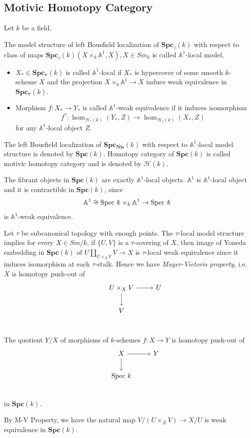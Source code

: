 \documentclass[b5paper,10pt]{article}
\begin{document}
\subsection{Motivic Homotopy Category}
Let $k$ be a field.
\begin{secdefn}
	The model structure of left Bousfield localization of $\mathbf{Spc}_\tau(k)$ with respect to class of maps $\mathbf{Spc}_\tau(k)(X \times_k \mathbb{A}^1, X), X \in Sm_k$ is called \emph{$\mathbb{A}^1$}-local model.
	\begin{itemize}
		\item $X_* \in \mathbf{Spc_\tau}(k) $ is called $\mathbb{A}^1$-local if $X_*$ is hypercover of some smooth $k$-scheme $X$ and the projection $X \times_k \mathbb{A}^1 \to X$ induce weak equivalence in $\mathbf{Spc_\tau}(k)$.
		\item Morphism $f: X_* \to Y_*$  is called $\mathbb{A}^1$-weak equivalence if it induces
		isomorphism
		\[
		f^* \colon \hom_{\mathcal{H}_\tau(k)}(Y_*, Z) \to \hom_{\mathcal{H}_\tau(k)}(X_*,Z)
		\]
		for any $\mathbb{A}^1$-local object $Z$.
	\end{itemize}
\end{secdefn}

\begin{secdefn}
	The left Bousfield localization of $\mathbf{Spc_{Nis}}(k)$ with respect to $\mathbb{A}^1$-local model structure is denoted by $\mathbf{Spc}(k)$. Homotopy category of $\mathbf{Spc}(k)$ is called motivic homotopy category and is denoted by $\mathcal{H}(k)$.
\end{secdefn}
The fibrant objects in $\mathbf{Spc}(k)$ are exactly $\mathbb{A}^1$-local objects. $\mathbb{A}^1$ is $\mathbb{A}^1$-local object and it is contractible in $\mathbf{Spc}(k)$, since
\[
\mathbb{A}^1 \cong \text{Spec } k \times_k \mathbb{A}^1 \to \text{Spec } k
\]
is $\mathbb{A}^1$-weak equivalence.

Let $\tau$ be  subcanonical topology with enough points. The $\tau$-local model structure implies for every $X \in Sm/k$, if $\{U,V\}$ is a $\tau$-covering of $X$, then image of Yoneda embedding in $\mathbf{Spc}(k)$ of $U\coprod_{U \times_X V} V \to X$
is $\tau$-local weak equivalence since it induces isomorphism at each $\tau$-stalk. Hence we have \emph{Mayer-Vietoris property}, i.e.\ $X$ is homotopy push-out of 
\[
\begin{tikzcd}
&U\times_X V \arrow[r] \arrow[d] & U\\
&V& \\
\end{tikzcd}
\]
\begin{secdefn}
	The quotient $Y/X$ of morphisms of $k$-schemes $f\colon  X \to Y$ is homotopy    push-out of 
	\[
	\begin{tikzcd}
	&X \arrow[r] \arrow[d]& Y \\
	& \spec k &\\
	\end{tikzcd}
	\]
	in $\mathbf{Spc}(k)$.
\end{secdefn}
By M-V Property, we have the natural map $V/(U \times_X V) \to X/U$ is weak equivalence in $\mathbf{Spc}(k)$.
\end{document}
